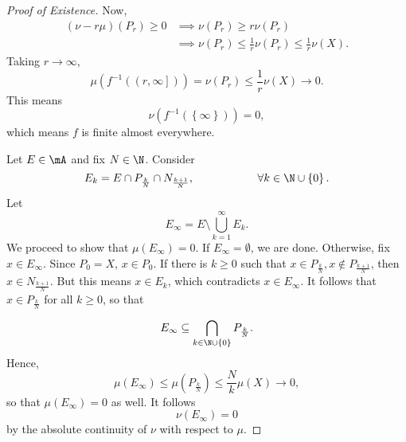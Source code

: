 \documentclass[pmath451]{subfiles}
\begin{document}
\begin{proof}[Proof of Existence]
        Now,
        \begin{align*}
            \left( \nu-r\mu \right)\left( P_r \right) \geq 0 & \implies \nu\left( P_r \right)\geq r\nu\left( P_r \right) \\
                                                             & \implies \nu\left( P_r \right)\leq \frac{1}{r}\nu\left( P_r \right) \leq \frac{1}{r}\nu\left( X \right).
        \end{align*} 
        Taking $r\to\infty$,
        \begin{equation*}
            \mu\left( f^{-1}\left( \left( r,\infty \right] \right) \right) = \nu\left( P_r \right) \leq \frac{1}{r}\nu\left( X \right) \to 0.
        \end{equation*}
        This means
        \begin{equation*}
            \nu\left( f^{-1}\left( \left\lbrace \infty \right\rbrace \right) \right) = 0,
        \end{equation*}
        which means $f$ is finite almost everywhere.

        Let $E\in\mA$ and fix $N\in\N$. Consider
        \begin{equation*}
            E_k = E\cap P_{\frac{k}{N}} \cap N_{\frac{k+1}{N}}, \hspace{2cm}\forall k\in\N\cup\left\lbrace 0 \right\rbrace.
        \end{equation*}
        Let
        \begin{equation*}
            E_{\infty} = E\setminus \bigcup^{\infty}_{k=1} E_k.
        \end{equation*}
        We proceed to show that $\mu\left( E_{\infty} \right)=0$. If $E_{\infty} = \emptyset$, we are done. Otherwise, fix $x\in E_{\infty}$. Since $P_0=X$, $x\in P_0$. If there is $k\geq 0$ such that $x\in P_{\frac{k}{N}}, x\notin P_{\frac{k+1}{N}}$, then $x\in N_{\frac{k+1}{N}}$. But this means $x\in E_k$, which contradicts $x\in E_{\infty}$. It follows that $x\in P_{\frac{k}{N}}$ for all $k\geq 0$, so that
        \begin{equation*}
            E_{\infty} \subseteq \bigcap^{}_{k\in\N\cup\left\lbrace 0 \right\rbrace} P_{\frac{k}{N}}.
        \end{equation*}
        Hence,
        \begin{equation*}
            \mu\left( E_{\infty} \right) \leq \mu\left( P_{\frac{k}{N}} \right) \leq \frac{N}{k} \mu\left( X \right) \to 0,
        \end{equation*}
        so that $\mu\left( E_{\infty} \right)=0$ as well. It follows
        \begin{equation*}
            \nu\left( E_{\infty} \right) = 0
        \end{equation*}
        by the absolute continuity of $\nu$ with respect to $\mu$.


\end{proof}
\end{document}
